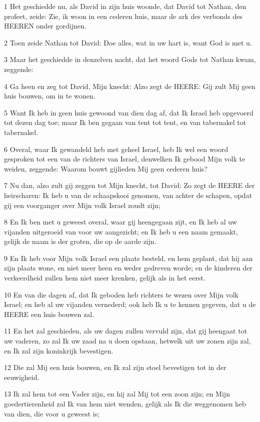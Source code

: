 \par 1 Het geschiedde nu, als David in zijn huis woonde, dat David tot Nathan, den profeet, zeide: Zie, ik woon in een cederen huis, maar de ark des verbonds des HEEREN onder gordijnen.
\par 2 Toen zeide Nathan tot David: Doe alles, wat in uw hart is, want God is met u.
\par 3 Maar het geschiedde in denzelven nacht, dat het woord Gods tot Nathan kwam, zeggende:
\par 4 Ga heen en zeg tot David, Mijn knecht: Alzo zegt de HEERE: Gij zult Mij geen huis bouwen, om in te wonen.
\par 5 Want Ik heb in geen huis gewoond van dien dag af, dat Ik Israel heb opgevoerd tot dezen dag toe; maar Ik ben gegaan van tent tot tent, en van tabernakel tot tabernakel.
\par 6 Overal, waar Ik gewandeld heb met geheel Israel, heb Ik wel een woord gesproken tot een van de richters van Israel, denwelken Ik gebood Mijn volk te weiden, zeggende: Waarom bouwt gijlieden Mij geen cederen huis?
\par 7 Nu dan, alzo zult gij zeggen tot Mijn knecht, tot David: Zo zegt de HEERE der heirscharen: Ik heb u van de schaapskooi genomen, van achter de schapen, opdat gij een voorganger over Mijn volk Israel zoudt zijn;
\par 8 En Ik ben met u geweest overal, waar gij heengegaan zijt, en Ik heb al uw vijanden uitgeroeid van voor uw aangezicht; en Ik heb u een naam gemaakt, gelijk de naam is der groten, die op de aarde zijn.
\par 9 En Ik heb voor Mijn volk Israel een plaats besteld, en hem geplant, dat hij aan zijn plaats wone, en niet meer heen en weder gedreven worde; en de kinderen der verkeerdheid zullen hem niet meer krenken, gelijk als in het eerst.
\par 10 En van die dagen af, dat Ik geboden heb richters te wezen over Mijn volk Israel; en heb al uw vijanden vernederd; ook heb Ik u te kennen gegeven, dat u de HEERE een huis bouwen zal.
\par 11 En het zal geschieden, als uw dagen zullen vervuld zijn, dat gij heengaat tot uw vaderen, zo zal Ik uw zaad na u doen opstaan, hetwelk uit uw zonen zijn zal, en Ik zal zijn koninkrijk bevestigen.
\par 12 Die zal Mij een huis bouwen, en Ik zal zijn stoel bevestigen tot in der eeuwigheid.
\par 13 Ik zal hem tot een Vader zijn, en hij zal Mij tot een zoon zijn; en Mijn goedertierenheid zal Ik van hem niet wenden, gelijk als Ik die weggenomen heb van dien, die voor u geweest is;
